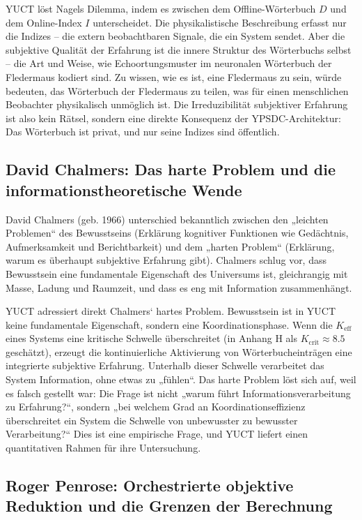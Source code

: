 \documentclass[12pt,a4paper]{article}
\begin{document}
	YUCT löst Nagels Dilemma, indem es zwischen dem Offline-Wörterbuch \(D\) und dem Online-Index \(I\) unterscheidet. Die physikalistische Beschreibung erfasst nur die Indizes – die extern beobachtbaren Signale, die ein System sendet. Aber die subjektive Qualität der Erfahrung ist die innere Struktur des Wörterbuchs selbst – die Art und Weise, wie Echoortungsmuster im neuronalen Wörterbuch der Fledermaus kodiert sind. Zu wissen, wie es ist, eine Fledermaus zu sein, würde bedeuten, das Wörterbuch der Fledermaus zu teilen, was für einen menschlichen Beobachter physikalisch unmöglich ist. Die Irreduzibilität subjektiver Erfahrung ist also kein Rätsel, sondern eine direkte Konsequenz der YPSDC-Architektur: Das Wörterbuch ist privat, und nur seine Indizes sind öffentlich.
	
	\subsection{David Chalmers: Das harte Problem und die informationstheoretische Wende}
	
	David Chalmers (geb. 1966) unterschied bekanntlich zwischen den „leichten Problemen“ des Bewusstseins (Erklärung kognitiver Funktionen wie Gedächtnis, Aufmerksamkeit und Berichtbarkeit) und dem „harten Problem“ (Erklärung, warum es überhaupt subjektive Erfahrung gibt). Chalmers schlug vor, dass Bewusstsein eine fundamentale Eigenschaft des Universums ist, gleichrangig mit Masse, Ladung und Raumzeit, und dass es eng mit Information zusammenhängt.
	
	YUCT adressiert direkt Chalmers‘ hartes Problem. Bewusstsein ist in YUCT keine fundamentale Eigenschaft, sondern eine Koordinationsphase. Wenn die \(K_{\mathrm{eff}}\) eines Systems eine kritische Schwelle überschreitet (in Anhang H als \(K_{\mathrm{crit}} \approx 8.5\) geschätzt), erzeugt die kontinuierliche Aktivierung von Wörterbucheinträgen eine integrierte subjektive Erfahrung. Unterhalb dieser Schwelle verarbeitet das System Information, ohne etwas zu „fühlen“. Das harte Problem löst sich auf, weil es falsch gestellt war: Die Frage ist nicht „warum führt Informationsverarbeitung zu Erfahrung?“, sondern „bei welchem Grad an Koordinationseffizienz überschreitet ein System die Schwelle von unbewusster zu bewusster Verarbeitung?“ Dies ist eine empirische Frage, und YUCT liefert einen quantitativen Rahmen für ihre Untersuchung.
	
	\subsection{Roger Penrose: Orchestrierte objektive Reduktion und die Grenzen der Berechnung}
	
\end{document}
